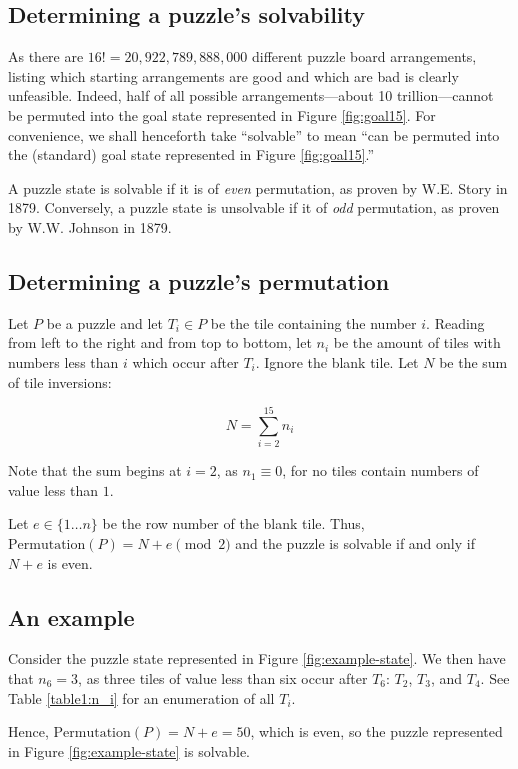 \documentclass{article}
\begin{document}
  \subsection*{Determining a puzzle's solvability}
    As there are $16!=20,922,789,888,000$ different puzzle board arrangements,
    listing which starting arrangements are good and which are bad is
    clearly unfeasible. Indeed, half of all possible arrangements---about
    10 trillion---cannot be permuted into the goal state represented in Figure
    \ref{fig:goal15}. For convenience, we shall henceforth take ``solvable'' to
    mean ``can be permuted into the (standard) goal state represented in Figure
    \ref{fig:goal15}.''

    A puzzle state is solvable if it is of \textit{even} permutation, as proven
    by W.E. Story in 1879. Conversely, a puzzle state is unsolvable if it of
    \textit{odd} permutation, as proven by W.W. Johnson in 1879.

  \subsection*{Determining a puzzle's permutation}
    Let $P$ be a puzzle and let $T_i\in P$ be the tile containing the number
    $i$. Reading from left to the right and from top to bottom, let $n_i$ be the
    amount of tiles with numbers less than $i$ which occur after $T_i$. Ignore
    the blank tile. Let $N$ be the sum of tile inversions:

    $$ N =\sum_{i=2}^{15} n_i $$

    Note that the sum begins at $i=2$, as $n_1\equiv 0$, for
    no tiles contain numbers of value less than $1$.

    Let $e\in\{1\dots n\}$ be the row number of the blank tile.
    Thus, $\text{Permutation}(P)=N+e\pmod{2}$ and the puzzle is solvable if and
    only if $N+e$ is even.

  \subsection*{An example}
    Consider the puzzle state represented in Figure \ref{fig:example-state}.
    We then have that $n_6=3$, as three tiles of value less than six occur after
    $T_6$: $T_2$, $T_3$, and $T_4$. See Table \ref{table1:n_i} for an
    enumeration of all $T_i$.

    
    

    Hence, $\text{Permutation}(P)= N + e= 50$, which is even, so the puzzle
    represented in Figure \ref{fig:example-state} is solvable.
\end{document}

